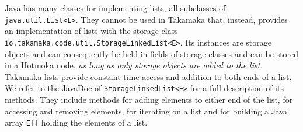 Java has many classes for implementing lists, all subclasses
of \texttt{java.util.List<E>}. They cannot be used in Takamaka that, instead,
provides an implementation of lists with the storage class
\texttt{io.takamaka.code.util.StorageLinkedList<E>}.
Its instances are storage objects and
can consequently be held in fields of storage classes and
can be stored in a Hotmoka node,
\emph{as long as only storage objects are added to the list}. Takamaka lists provide
constant-time access and addition to both ends of a list.
We refer to the JavaDoc of \texttt{StorageLinkedList<E>} for a full description of its methods.
They include methods for adding elements to either end of the list, for accessing and
removing elements, for iterating on a list and for building a Java array
\texttt{E[]} holding the elements of a list.

